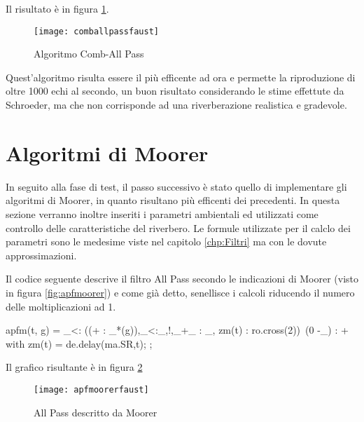 Il risultato è in figura \ref{fig:comballpassfaust}.

\begin{figure}[htp]
\centering
\texttt{[image: comballpassfaust]}
\caption{Algoritmo Comb-All Pass}
\label{fig:comballpassfaust}
\end{figure}

Quest'algoritmo risulta essere il più efficente ad ora e permette la riproduzione di oltre 1000 echi al secondo, un buon risultato considerando le stime effettute da Schroeder, ma che non corrisponde ad una riverberazione realistica e gradevole.

\section{Algoritmi di Moorer}

In seguito alla fase di test, il passo successivo è stato quello di implementare gli algoritmi di Moorer, in quanto risultano più efficenti dei precedenti. 
In questa sezione verranno inoltre inseriti i parametri ambientali ed utilizzati come controllo delle caratteristiche del riverbero. Le formule utilizzate per il calclo dei parametri sono le medesime viste nel capitolo \ref{chp:Filtri} ma con le dovute approssimazioni.

\bigskip

Il codice seguente descrive il filtro All Pass secondo le indicazioni di Moorer (visto in figura \ref{fig:apfmoorer}) e come già detto, senellisce i calcoli riducendo il numero delle moltiplicazioni ad 1.

\begin{code}
apfm(t, g) = _<: ((+ : _*(g)),_<:_,!,_+_ : _, zm(t) : ro.cross(2))~(0 -_) : +
with{
    zm(t) = de.delay(ma.SR,t);
};
\end{code}

\bigskip

Il grafico risultante è in figura \ref{fig:apfmoorerfaust}

\begin{figure}[htp]
\centering
\texttt{[image: apfmoorerfaust]}
\caption{All Pass descritto da Moorer}
\label{fig:apfmoorerfaust}
\end{figure}
